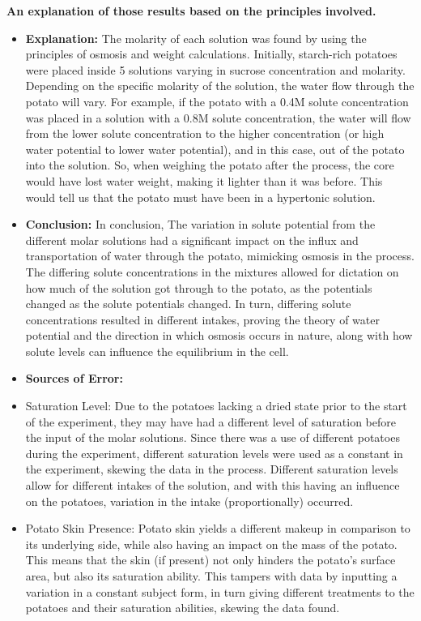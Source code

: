 \documentclass[letterpaper]{article}
\begin{document}
\begin{doublespace}
\textbf{An explanation of those results based on the principles involved.}

\begin{itemize}
\item
  \textbf{Explanation:} The molarity of each solution was found by using the principles of osmosis and weight calculations. Initially, starch-rich potatoes were placed inside 5 solutions varying in sucrose concentration and molarity. Depending on the specific molarity of the solution, the water flow through the potato will vary. For example, if the potato with a 0.4M solute concentration was placed in a solution with a 0.8M solute concentration, the water will flow from the lower solute concentration to the higher concentration (or high water potential to lower water potential), and in this case, out of the potato into the solution. So, when weighing the potato after the process, the core would have lost water weight, making it lighter than it was before. This would tell us that the potato must have been in a hypertonic solution.
\item
  \textbf{Conclusion:} In conclusion, The variation in solute potential from the different molar solutions had a significant impact on the influx and transportation of water through the potato, mimicking osmosis in the process. The differing solute concentrations in the mixtures allowed for dictation on how much of the solution got through to the potato, as the potentials changed as the solute potentials changed. In turn, differing solute concentrations resulted in different intakes, proving the theory of water potential and the direction in which osmosis occurs in nature, along with how solute levels can influence the equilibrium in the cell.
\item
  \textbf{Sources of Error:}
\item
  Saturation Level: Due to the potatoes lacking a dried state prior to the start of the experiment, they may have had a different level of saturation before the input of the molar solutions. Since there was a use of different potatoes during the experiment, different saturation levels were used as a constant in the experiment, skewing the data in the process. Different saturation levels allow for different intakes of the solution, and with this having an influence on the potatoes, variation in the intake (proportionally) occurred.
\item
  Potato Skin Presence: Potato skin yields a different makeup in comparison to its underlying side, while also having an impact on the mass of the potato. This means that the skin (if present) not only hinders the potato's surface area, but also its saturation ability. This tampers with data by inputting a variation in a constant subject form, in turn giving different treatments to the potatoes and their saturation abilities, skewing the data found.
\end{itemize}

 \end{doublespace} 
\end{document}
